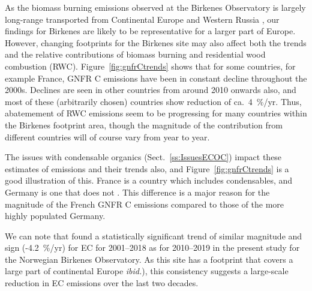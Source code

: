 As the biomass burning emissions observed at the
Birkenes Observatory is largely long-range transported from Continental
Europe and Western Russia \citep{Yttri2021}, our findings for Birkenes
are likely to be representative for a larger part of Europe. However,
changing footprints  for the Birkenes site may also affect both the trends and
the relative contributions of biomass burning and residential wood combustion (RWC).
Figure~\ref{fig:gnfrCtrends} shows that for some countries, for example France, GNFR C \pmfine emissions have been in constant decline throughout the 2000s. Declines are seen in other countries from around 2010 onwards also, and most of these (arbitrarily chosen) countries show reduction of ca.~4~\%/yr. Thus, abatemement of RWC emissions seem to be progressing for many countries within the Birkenes footprint area, though the magnitude of the contribution from different countries will of course vary from year to year.

The issues with condensable organics (Sect.~\ref{ss:IssuesECOC}) impact these estimates of \pmfine emissions and their trends also, and Figure~\ref{fig:gnfrCtrends} is a good illustration of this. France is a country which includes condensables, and Germany is one that does not \citep{CONDws2020}. This difference is a major reason for the magnitude of the French GNFR C emissions compared to those of the more highly populated Germany. 




We can note that \citet{Yttri2021} found a statistically significant trend of similar magnitude and sign (-4.2~\%/yr)  for EC for 2001--2018 as for 2010--2019 in the present study for the Norwegian Birkenes Observatory. As this site has a footprint that covers a large part of continental Europe {\it ibid.}), this consistency suggests a large-scale reduction in EC emissions over the last two decades.


